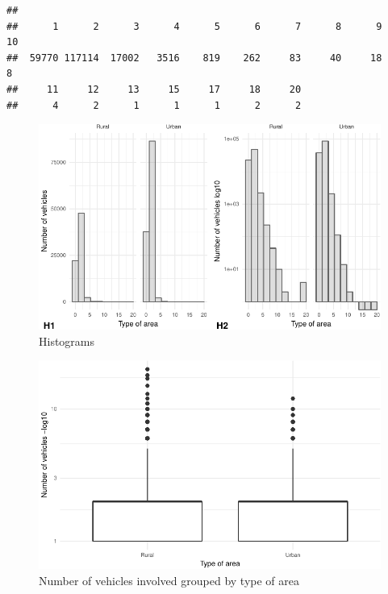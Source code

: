 \documentclass[]{article}
\begin{document}
\begin{verbatim}
## 
##      1      2      3      4      5      6      7      8      9     10 
##  59770 117114  17002   3516    819    262     83     40     18      8 
##     11     12     13     15     17     18     20 
##      4      2      1      1      1      2      2
\end{verbatim}

\begin{figure}[H]

{\centering \includegraphics{READMEv2_files/figure-latex/fig-1} 

}

\caption{Histograms}\label{fig:fig}
\end{figure}

\begin{figure}[H]

{\centering \includegraphics{READMEv2_files/figure-latex/fig2-1} 

}

\caption{Number of vehicles involved grouped by type of area}\label{fig:fig2}
\end{figure}
\end{document}
